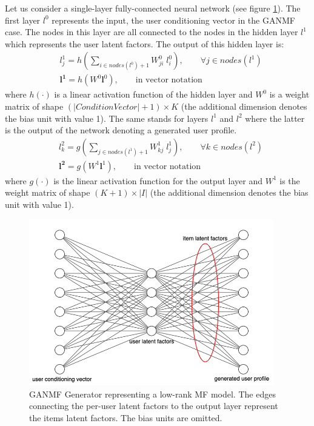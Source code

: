Let us consider a single-layer fully-connected neural network (see figure \ref{fig:generator_MF}). The first layer $l^0$ represents the input, the user conditioning vector in the GANMF case. The nodes in this layer are all connected to the nodes in the hidden layer $l^1$ which represents the user latent factors. The output of this hidden layer is:
\[
\begin{split}
    & l^1_{j} = h(\sum_{i \in nodes(l^0) + 1} W^0_{ji} \; l^0_{i}), \qquad \forall{j \in nodes(l^1)}\\[5pt]
    & \mathbf{l^1} = h(W^{0}\mathbf{l}^{0}), \qquad \text{in vector notation}
\end{split}
\]
where $h(\cdot)$ is a linear activation function of the hidden layer and $W^0$ is a weight matrix of shape $(|ConditionVector|+1) \times K$ (the additional dimension denotes the bias unit with value 1). The same stands for layers $l^1$ and $l^2$ where the latter is the output of the network denoting a generated user profile.
\begin{equation}
    \begin{split}
        & l^2_{k} = g(\sum_{j \in nodes(l^1)+1} W^1_{kj} \; l^1_{j}), \qquad \forall{k \in nodes(l^2)}\\[5pt]
        & \mathbf{l^{2}} = g(W^{1}\mathbf{l}^{1}), \qquad \text{in vector notation}
    \end{split}
    \label{eq:output_layer_mult}
\end{equation}
where $g(\cdot)$ is the linear activation function for the output layer and $W^1$ is the weight matrix of shape $(K+1) \times |I|$ (the additional dimension denotes the bias unit with value 1).
\begin{figure}[h!]
    \centering
    \includegraphics[width=0.95\textwidth]{model/fully_connected_generator.png}
    \caption{GANMF Generator representing a low-rank MF model. The edges connecting the per-user latent factors to the output layer represent the items latent factors. The bias units are omitted.}
    \label{fig:generator_MF}
\end{figure}

